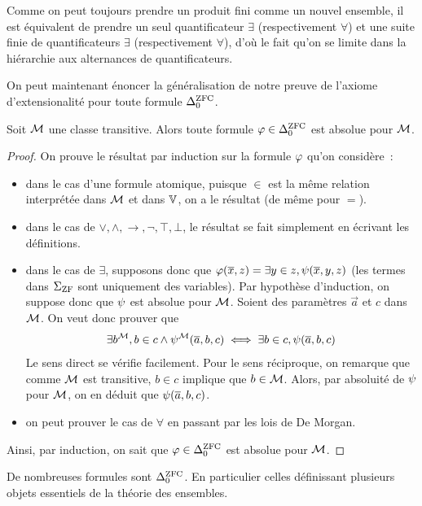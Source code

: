 \begin{remark}
  Comme on peut toujours prendre un produit fini comme un nouvel ensemble, il
  est équivalent de prendre un seul quantificateur $\exists$ (respectivement
  $\forall$) et une suite finie de quantificateurs $\exists$ (respectivement
  $\forall$), d'où le fait qu'on se limite dans la hiérarchie aux alternances
  de quantificateurs.
\end{remark}

On peut maintenant énoncer la généralisation de notre preuve de l'axiome
d'extensionalité pour toute formule $\Delta_{0}^{\operatorname{ZFC}}$.

\begin{proposition}
  Soit $\mathcal{M}$ une classe transitive. Alors toute formule $\varphi\in\Delta_{0}^{\operatorname{ZFC}}$
  est absolue pour $\mathcal{M}$.
\end{proposition}

\begin{proof}
  On prouve le résultat par induction sur la formule $\varphi$ qu'on considère~:
  \begin{itemize}
  \item dans le cas d'une formule atomique, puisque $\in$ est la même relation
    interprétée dans $\mathcal{M}$ et dans $\mathbb V$, on a le résultat (de même pour
    $=$).
  \item dans le cas de $\lor,\land,\to,\lnot,\top,\bot$, le résultat se fait
    simplement en écrivant les définitions.
  \item dans le cas de $\exists$, supposons donc que
    $\varphi(\overline{x},z) = \exists y \in z,\psi(\overline{x},y,z)$
    (les termes dans $\Sigma_{\operatorname{ZF}}$ sont uniquement des variables). Par hypothèse
    d'induction, on suppose donc que $\psi$ est absolue pour $\mathcal{M}$. Soient
    des paramètres $\vec a$ et $c$ dans $\mathcal{M}$. On veut donc prouver que
    \[\exists b^{\mathcal{M}}, b \in c \land \psi^{\mathcal{M}}(\overline{a},b,c)
    \iff \exists b \in c, \psi(\overline{a},b,c)\]
    Le sens direct se vérifie facilement. Pour le sens réciproque, on remarque
    que comme $\mathcal{M}$ est transitive, $b \in c$ implique que $b \in \mathcal{M}$.
    Alors, par absoluité de $\psi$ pour $\mathcal{M}$, on en déduit que
    $\psi(\overline{a},b,c)$.
  \item on peut prouver le cas de $\forall$ en passant par les lois de De
    Morgan.
  \end{itemize}
  Ainsi, par induction, on sait que $\varphi \in \Delta_{0}^{\operatorname{ZFC}}$ est absolue pour
  $\mathcal{M}$.
\end{proof}

De nombreuses formules sont $\Delta_{0}^{\operatorname{ZFC}}$. En particulier celles définissant
plusieurs objets essentiels de la théorie des ensembles.

